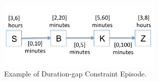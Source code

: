 \begin{figure}[h]
\centering
\includegraphics[width=0.7\textwidth]{adlfigs/durationgapconstraint.pdf}
\caption{Example of Duration-gap Constraint Episode.\label{fig_durationgapconstraint}}
\end{figure}
